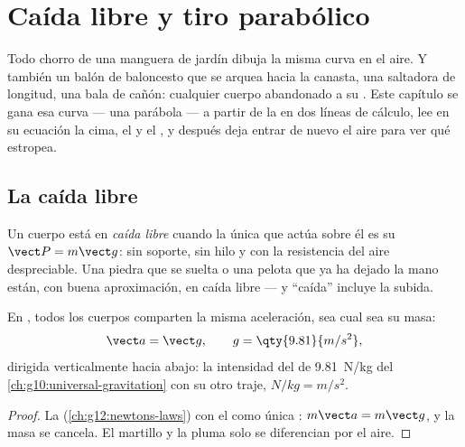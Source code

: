 \chapter{Caída libre y tiro parabólico}\label{ch:g12:projectile-motion}

Todo chorro de una manguera de jardín dibuja la misma curva en el aire. Y también un
balón de baloncesto que se arquea hacia la canasta, una saltadora de longitud, una
bala de cañón: cualquier cuerpo abandonado a su . Este capítulo se gana esa curva
--- una parábola --- a partir de la  en dos líneas de cálculo,
lee en su ecuación la cima, el  y el , y después deja entrar de
nuevo el aire para ver qué estropea.

\section{La caída libre}

\begin{definition}\label{def:g12:projectile-motion:freefall}
Un cuerpo está en \emph{caída libre} cuando la única  que
actúa sobre él es su  $\vect P = m\vect g$: sin soporte, sin hilo y con la
resistencia del aire despreciable. Una piedra que se suelta o una pelota que ya ha
dejado la mano están, con buena aproximación, en caída libre --- y ``caída'' incluye
la subida.
\end{definition}

\begin{theorem}\label{thm:g12:projectile-motion:galileo}
En , todos los cuerpos comparten la misma aceleración, sea cual sea su
masa:
\[
\vect a = \vect g, \qquad g = \qty{9.81}{m/s^2},
\]
dirigida verticalmente hacia abajo: la intensidad del  de \qty{9.81}{N/kg} del
\cref{ch:g10:universal-gravitation} con su otro traje,
$\unit{N/kg} = \unit{m/s^2}$.
\end{theorem}

\begin{proof}
La  (\cref{ch:g12:newtons-laws}) con el  como única :
$m\vect a = m\vect g$, y la masa se cancela. El martillo y la pluma solo se
diferencian por el aire.
\end{proof}

